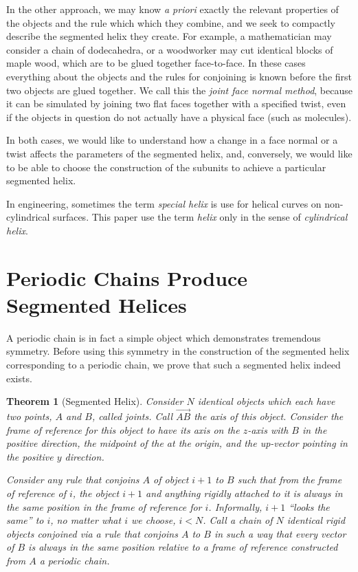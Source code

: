 \documentclass[11pt]{article}
\newtheorem{theorem}{Theorem}
\begin{document}
{In the other approach, we may know {\it a priori} exactly the
relevant properties of the objects and the rule which which they combine, and we seek to compactly describe the segmented helix they create.
For example, a mathematician may consider a chain of dodecahedra, or a woodworker may cut identical blocks of maple wood,
which are to be glued together face-to-face. In these cases everything about the objects and the rules for conjoining
is known before the first two objects are glued together. We call this the {\em joint face normal method}, because
it can be simulated by joining two flat faces together with a specified twist, even if the objects in question
do not actually have a physical face (such as molecules).

In both cases, we would like to understand how a change in a face normal or a twist affects the parameters
of the segmented helix,
and, conversely, we would like to be able to choose the construction of the subunits to achieve a particular segmented helix.

In engineering, sometimes the term {\em special helix}\cite{gu2012research} is use for helical curves on non-cylindrical surfaces. This paper use the term {\em helix} only in the sense of {\em cylindrical helix}.

\section{Periodic Chains Produce Segmented Helices}

A periodic chain is in fact a simple object which demonstrates tremendous symmetry.
Before using this symmetry in the construction of the segmented helix corresponding to a periodic chain, we
prove that such a segmented helix indeed exists.

\begin{theorem}[Segmented Helix]
  Consider $N$ identical objects which each have two points, $A$ and $B$, called {\em joints}. Call
  $\overrightarrow{AB}$ the {\em axis} of this object.
  Consider the frame of reference for this object to have
  its axis on the $z$-axis with $B$ in the positive direction, the
  midpoint of the at the origin, and the up-vector pointing in the positive $y$ direction.

  Consider any rule that conjoins $A$ of object $i+1$ to $B$ such that
  from the frame of reference of $i$, the object $i+1$ and anything rigidly
  attached to it is always in the same position in the frame of reference for $i$.
  Informally, $i+1$ ``looks the same'' to $i$, no matter what $i$ we choose, $i < N$.
  Call a chain of $N$ identical rigid objects conjoined via a rule that
  conjoins $A$ to $B$ in such a way that every vector
  of $B$ is always in the same position relative to a frame of reference
  constructed from $A$ a {\em periodic chain.}


\end{theorem}}
\end{document}
